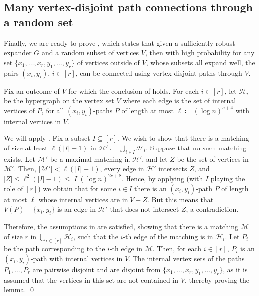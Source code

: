 \documentclass[10pt]{article}
\theoremstyle{plain}
\numberwithin{theorem}{section}
\theoremstyle{definition}
\theoremstyle{remark}
\renewenvironment{proof}[1][]{\begin{trivlist}
\item[\hspace{\labelsep}{\bf\noindent Proof#1.\/}] }{\qed\end{trivlist}}
\newcommand{\cH}{\mathcal{H}}
\newcommand{\cM}{\mathcal{M}}
\renewcommand{\setminus}{-}
\theoremstyle{plain}
\begin{document}
	\subsection{Many vertex-disjoint path connections through a random set} \label{subsec:expansion-step-three}

		Finally, we are ready to prove , which states that given a sufficiently robust expander $G$ and a random subset of vertices $V$, then with high probability for any set $\{x_1, \ldots, x_r, y_1, \ldots, y_r\}$ of vertices outside of $V$, whose subsets all expand well, the pairs $(x_i, y_i)$, $i \in [r]$, can be connected using vertex-disjoint paths through $V$. 


		\begin{proof}[ of \Cref{lem:connecting}]
			Fix an outcome of $V$ for which the conclusion of  holds. For each $i \in [r]$, let $\cH_i$ be the hypergraph on the vertex set $V$ where each edge is the set of internal vertices of $P$, for all $(x_i, y_i)$-paths $P$ of length at most $\ell \coloneqq (\log n)^{c+4}$ with internal vertices in $V$.

			We will apply . Fix a subset $I \subseteq [r]$. We wish to show that there is a matching of size at least $\ell(|I|-1)$ in $\cH' \coloneqq \bigcup_{i \in I} \cH_i$. Suppose that no such matching exists. Let $\cM'$ be a maximal matching in $\cH'$, and let $Z$ be the set of vertices in $\cM'$. Then, $|\cM'| < \ell(|I|-1)$, every edge in $\cH'$ intersects $Z$, and $|Z| \le \ell^2(|I|-1) \le |I|(\log n)^{2c+8}$. Hence, by applying  (with $I$ playing the role of $[r]$) we obtain that for some $i \in I$ there is an $(x_i, y_i)$-path $P$ of length at most $\ell$ whose internal vertices are in $V \setminus Z$. But this means that $V(P) \setminus \{x_i, y_i\}$ is an edge in $\cH'$ that does not intersect $Z$, a contradiction.

			Therefore, the assumptions in  are satisfied, showing that there is a matching $\cM$ of size $r$ in $\bigcup_{i \in [r]}\cH_i$, such that the $i$-th edge of the matching is in $\cH_i$. Let $P_i$ be the path corresponding to the $i$-th edge in $\cM$. Then, for each $i \in [r]$, $P_i$ is an $(x_i, y_i)$-path with internal vertices in $V$. The internal vertex sets of the paths $P_1, \ldots, P_r$ are pairwise disjoint and are disjoint from $\{x_1, \ldots, x_r, y_1, \ldots, y_r\}$, as it is assumed that the vertices in this set are not contained in $V$, thereby proving the lemma.
		\end{proof}
\end{document}
